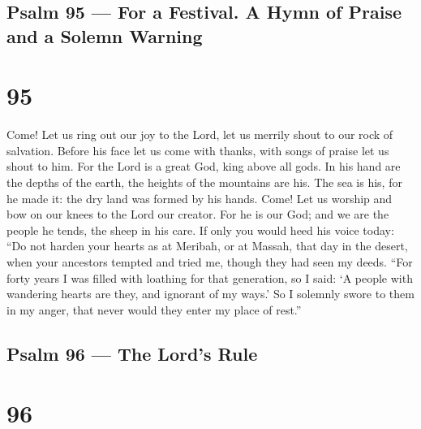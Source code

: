 \hypertarget{psalm-95-for-a-festival.-a-hymn-of-praise-and-a-solemn-warning}{%
\subsection{Psalm 95 --- For a Festival. A Hymn of Praise and a Solemn
Warning}\label{psalm-95-for-a-festival.-a-hymn-of-praise-and-a-solemn-warning}}

\hypertarget{section-94}{%
\section{95}\label{section-94}}

 Come! Let us ring out our joy to the Lord, let us merrily
shout to our rock of salvation.  Before his face let us come
with thanks, with songs of praise let us shout to him.  For
the Lord is a great God, king above all gods.  In his hand
are the depths of the earth, the heights of the mountains are his.
 The sea is his, for he made it: the dry land was formed by
his hands.  Come! Let us worship and bow on our knees to the
Lord our creator.  For he is our God; and we are the people
he tends, the sheep in his care. If only you would heed his voice today:
 ``Do not harden your hearts as at Meribah, or at Massah,
that day in the desert,  when your ancestors tempted and
tried me, though they had seen my deeds.  ``For forty years
I was filled with loathing for that generation, so I said: `A people
with wandering hearts are they, and ignorant of my ways.' 
So I solemnly swore to them in my anger, that never would they enter my
place of rest.''

\hypertarget{psalm-96-the-lords-rule}{%
\subsection{Psalm 96 --- The Lord's
Rule}\label{psalm-96-the-lords-rule}}

\hypertarget{section-95}{%
\section{96}\label{section-95}}

